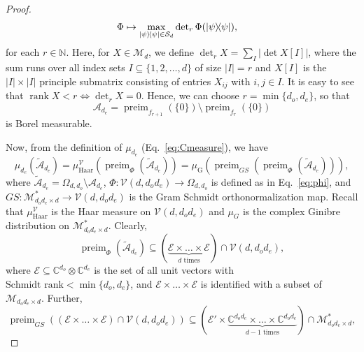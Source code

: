 \documentclass[a4paper,onecolumn,10pt,accepted=2022-07-11]{quantumarticle}
\newcommand{\M}[1]{\mathcal{M}_{#1}}
\newcommand{\St}[1]{\mathcal{S}_{#1}}
\newcommand{\C}[1]{\mathbb{C}^{#1}}
\newcommand{\gin}{\operatorname{G}}
\newcommand{\haar}{\operatorname{Haar}}
\theoremstyle{definition}
\begin{document}
\begin{proof}
\begin{align*}
     \Phi &\mapsto \max_{\ketbra{\psi}\in\St{d}} \operatorname{det}_r \Phi(\ketbra{\psi}),
\end{align*}
for each $r \in {\mathbb{N}}$. Here, for $X\in\M{d}$, we define $\det_r X = \sum_I |\det X[I]|$, where the sum runs over all index sets $I\subseteq \{1,2,\ldots ,d\}$ of size $|I|=r$ and $X[I]$ is the $|I|\times |I|$ principle submatrix consisting of entries $X_{ij}$ with $i,j\in I$. It is easy to see that $\operatorname{rank}X<r \iff \det_r X=0$. Hence, we can choose $r=\min\{d_o,d_e\}$, so that
\begin{equation*}
    \mathcal{A}_{d_e}=\operatorname{preim}_{f_{r+1}}(\{0\})\setminus \operatorname{preim}_{f_r}(\{0\})
\end{equation*} 
is Borel measurable. 

Now, from the definition of $\mu_{d_e}$ (Eq.~\eqref{eq:Cmeasure}), we have
\begin{equation*}
    \mu_{d_e}(\widetilde{\mathcal{A}}_{d_e}) = \mu^{\mathcal{V}}_{\haar}( \operatorname{preim}_{\Phi}(\widetilde{\mathcal{A}}_{d_e})) = \mu_{\gin}\left(\operatorname{preim}_{GS}(\operatorname{preim}_{\Phi}(\widetilde{\mathcal{A}}_{d_e}))\right),
\end{equation*}
where $\widetilde{\mathcal{A}}_{d_e}=\Omega_{d,d_o}\setminus \mathcal{A}_{d_e}$, $\Phi:\mathcal{V}(d,d_od_e)\rightarrow \Omega_{d,d_o}$ is defined as in Eq.~\eqref{eq:phi}, and $GS:\mathcal{M}^*_{d_od_e \times d} \rightarrow \mathcal{V}(d,d_od_e)$ is the Gram Schmidt orthonormalization map. Recall that $\mu^{\mathcal{V}}_{\haar}$ is the Haar measure on $\mathcal{V}(d,d_o d_e)$ and $\mu_G$ is the complex Ginibre distribution on $\mathcal{M}^*_{d_{o}d_{e} \times d}$. Clearly, 
\begin{equation*}
    \operatorname{preim}_{\Phi}(\widetilde{\mathcal{A}}_{d_e}) \subseteq (\underbrace{\mathcal{E}\times \ldots \times \mathcal{E}}_{d \text{ times}}) \cap \mathcal{V}(d,d_od_e),
\end{equation*}
where $\mathcal{E}\subseteq \C{d_o}\otimes \C{d_e}$ is the set of all unit vectors with $\text{Schmidt rank}<\min\{d_o,d_e\}$, and $\mathcal{E}\times \ldots \times \mathcal{E}$ is identified with a subset of $\M{d_o d_e \times d}$. Further, 
\begin{equation*}
    \operatorname{preim}_{GS}((\mathcal{E}\times \ldots \times \mathcal{E}) \cap \mathcal{V}(d,d_od_e)  ) \subseteq (\mathcal{E}' \times \underbrace{\C{d_od_e}\times \ldots \times \C{d_od_e}}_{d-1 \text{ times}}) \cap \mathcal{M}^*_{d_od_e \times d},
\end{equation*}

\end{proof}
\end{document}
